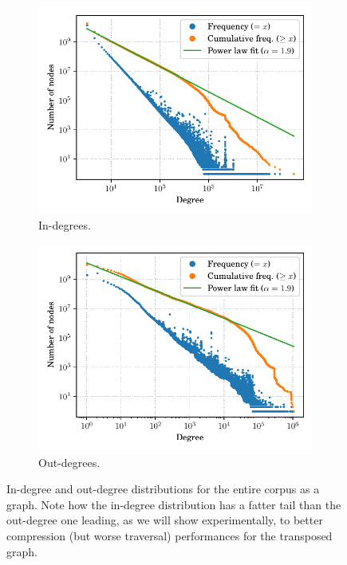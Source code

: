\begin{figure}
    \centering
    \begin{subfigure}[b]{.49\textwidth}
        \centering
        \includegraphics[width=\linewidth]{img/topology/inout/full_in}
        \caption{In-degrees.}%
        \label{fig:compression-indegree}
    \end{subfigure}\hfill
    \begin{subfigure}[b]{.49\textwidth}
        \centering
        \includegraphics[width=\linewidth]{img/topology/inout/full_out}
        \caption{Out-degrees.}%
        \label{fig:compression-outdegree}
    \end{subfigure}
    \caption{In-degree and out-degree distributions for the entire corpus as a
    graph. Note how the in-degree distribution has a fatter tail than the
    out-degree one leading, as we will show experimentally, to better
    compression (but worse traversal) performances for the transposed graph.}%
    \label{fig:compression-inoutdegree}
\end{figure}

